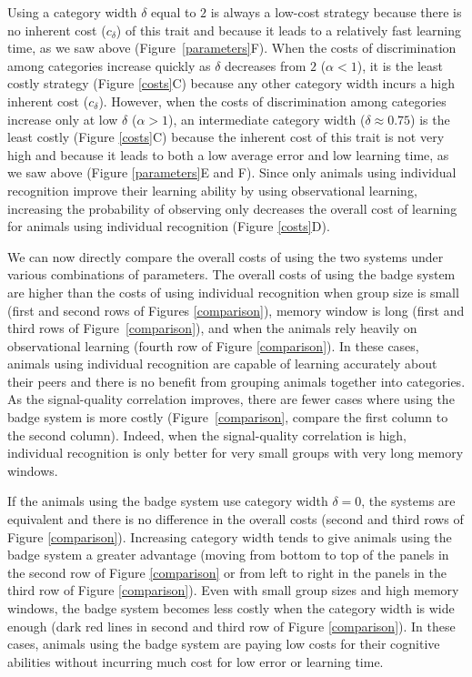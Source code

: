 Using a category width $\delta$ equal to $2$ is always a low-cost strategy because there is no inherent cost ($c_\delta$) of this trait and because it leads to a relatively fast learning time, as we saw above (Figure~\ref{parameters}F).  When the costs of discrimination among categories increase quickly as $\delta$ decreases from $2$ ($\alpha<1$), it is the least costly strategy (Figure \ref{costs}C) because any other category width incurs a high inherent cost ($c_\delta$). However, when the costs of discrimination among categories increase only at low $\delta$ ($\alpha>1$), an intermediate category width ($\delta\approx 0.75$) is the least costly (Figure \ref{costs}C) because the inherent cost of this trait is not very high and because it leads to both a low average error and low learning time, as we saw above (Figure \ref{parameters}E and F). Since only animals using individual recognition improve their learning ability by using observational learning, increasing the probability of observing only decreases the overall cost of learning for animals using individual recognition (Figure \ref{costs}D). 

We can now directly compare the overall costs of using the two systems under various combinations of parameters. The overall costs of using the badge system are higher than the costs of using individual recognition when group size is small (first and second rows of Figures \ref{comparison}), memory window is long (first and third rows of Figure~\ref{comparison}), and when the animals rely heavily on observational learning (fourth row of Figure \ref{comparison}). In these cases, animals using individual recognition are capable of learning accurately about their peers and there is no benefit from grouping animals together into categories. As the signal-quality correlation improves, there are fewer cases where using the badge system is more costly (Figure~\ref{comparison}, compare the first column to the second column). Indeed, when the signal-quality correlation is high, individual recognition is only better for very small groups with very long memory windows. 

If the animals using the badge system use category width $\delta=0$, the systems are equivalent and there is no difference in the overall costs (second and third rows of Figure \ref{comparison}). Increasing category width tends to give animals using the badge system a greater advantage (moving from bottom to top of the panels in the second row of Figure \ref{comparison} or from left to right in the panels in the third row of Figure \ref{comparison}). Even with small group sizes and high memory windows, the badge system becomes less costly when the category width is wide enough (dark red lines in second and third row of Figure \ref{comparison}). In these cases, animals using the badge system are paying low costs for their cognitive abilities without incurring much cost for low error or learning time.

